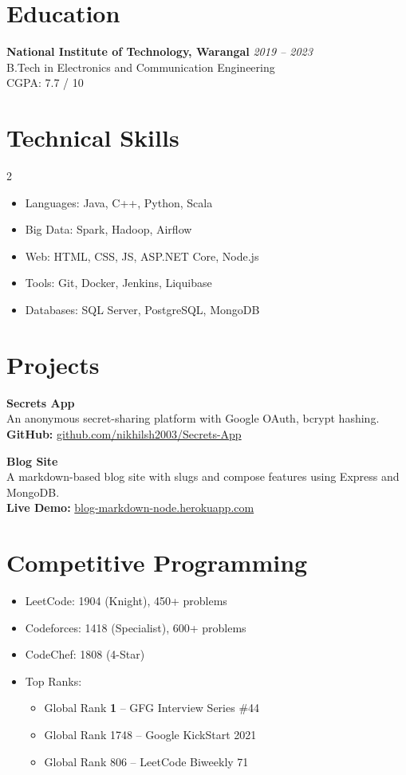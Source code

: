 \documentclass[a4paper,10pt]{article}
\begin{document}
\section*{Education}
\textbf{National Institute of Technology, Warangal} \hfill \textit{2019 -- 2023} \\
B.Tech in Electronics and Communication Engineering \\
CGPA: 7.7 / 10

\section*{Technical Skills}
\begin{multicols}{2}
\begin{itemize}[leftmargin=*]
  \item Languages: Java, C++, Python, Scala
  \item Big Data: Spark, Hadoop, Airflow
  \item Web: HTML, CSS, JS, ASP.NET Core, Node.js
  \item Tools: Git, Docker, Jenkins, Liquibase
  \item Databases: SQL Server, PostgreSQL, MongoDB
\end{itemize}
\end{multicols}

\section*{Projects}
\textbf{Secrets App} \\
An anonymous secret-sharing platform with Google OAuth, bcrypt hashing. \\
\textbf{GitHub:} \href{https://github.com/nikhilsh2003/Secrets-App}{github.com/nikhilsh2003/Secrets-App}

\vspace{0.5em}
\textbf{Blog Site} \\
A markdown-based blog site with slugs and compose features using Express and MongoDB. \\
\textbf{Live Demo:} \href{https://blog-markdown-node.herokuapp.com/}{blog-markdown-node.herokuapp.com}

\section*{Competitive Programming}
\begin{itemize}[leftmargin=*]
  \item LeetCode: 1904 (Knight), 450+ problems
  \item Codeforces: 1418 (Specialist), 600+ problems
  \item CodeChef: 1808 (4-Star)
  \item Top Ranks:
  \begin{itemize}
    \item Global Rank \textbf{1} -- GFG Interview Series \#44
    \item Global Rank 1748 – Google KickStart 2021
    \item Global Rank 806 – LeetCode Biweekly 71
  \end{itemize}
\end{itemize}
\end{document}

